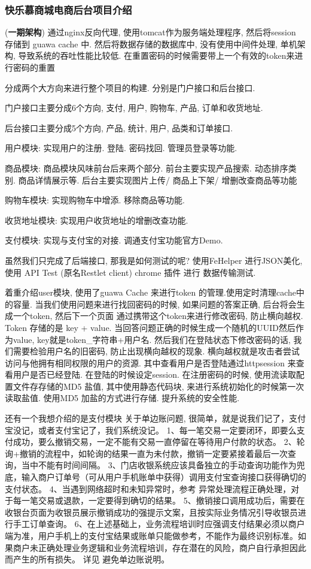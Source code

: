 \documentclass[UTF8]{ctexart}
\begin{document}
\subsubsection{快乐慕商城电商后台项目介绍}
(\textbf{一期架构}) 通过nginx反向代理, 使用tomcat作为服务端处理程序, 然后将session 存储到 guawa cache 中. 然后将数据存储的数据库中, 没有使用中间件处理, 单机架构, 导致系统的吞吐性能比较低. 在重置密码的时候需要带上一个有效的token来进行密码的重置

分成两个大方向来进行整个项目的构建. 分别是门户接口和后台接口.

门户接口主要分成6个方向, 支付, 用户, 购物车, 产品, 订单和收货地址.

后台接口主要分成5个方向, 产品, 统计, 用户, 品类和订单接口.

用户模块: 实现用户的注册. 登陆. 密码找回. 管理员登录等功能.

商品模块: 商品模块风味前台后来两个部分. 前台主要实现产品搜索. 动态排序类别. 商品详情展示等. 后台主要实现图片上传/ 商品上下架/ 增删改查商品等功能

购物车模块: 实现购物车中增添. 移除商品等功能.

收货地址模块: 实现用户收货地址的增删改查功能.

支付模块: 实现与支付宝的对接. 调通支付宝功能官方Demo.

虽然我们只完成了后端接口, 那我是如何测试的呢?  使用FeHelper 进行JSON美化, 使用 API Test (原名Restlet client) chrome 插件 进行 数据传输测试.

着重介绍user模块, 使用了guawa Cache 来进行token 的管理.使用定时清理cache中的容量.
当我们使用问题来进行找回密码的时候, 如果问题的答案正确, 后台将会生成一个token, 然后下一个页面 通过携带这个token来进行修改密码, 防止横向越权. Token 存储的是 key + value. 当回答问题正确的时候生成一个随机的UUID然后作为value, key就是token\_字符串+用户名. 然后我们在登陆状态下修改密码的话, 我们需要检验用户名的旧密码, 防止出现横向越权的现象. 横向越权就是攻击者尝试访问与他拥有相同权限的用户的资源. 其中查看用户是否登陆通过httpsession 来查看用户是否已经登陆.  在登陆的时候设定session. 在注册密码的时候, 使用流读取配置文件存存储的MD5 盐值, 其中使用静态代码块, 来进行系统初始化的时候第一次读取盐值. 使用MD5 加盐的方式进行存储.    提升系统的安全性能.





还有一个我想介绍的是支付模块
关于单边账问题, 很简单，就是说我们记了，支付宝没记，或者支付宝记了，我们系统没记。
1、每一笔交易一定要闭环，即要么支付成功，要么撤销交易，一定不能有交易一直停留在等待用户付款的状态。
2、轮询+撤销的流程中，如轮询的结果一直为未付款，撤销一定要紧接着最后一次查询，当中不能有时间间隔。
3、门店收银系统应该具备独立的手动查询功能作为兜底，输入商户订单号（可从用户手机账单中获得）调用支付宝查询接口获得确切的支付状态。
4、当遇到网络超时和未知异常时，参考 异常处理流程正确处理，对于每一笔交易或退款，一定要得到确切的结果。
5、撤销接口调用成功后，需要在收银台页面为收银员展示撤销成功的强提示文案，且按实际业务情况引导收银员进行手工订单查询。
6、在上述基础上，业务流程培训时应强调支付结果必须以商户端为准，用户手机上的支付宝结果或账单只能做参考，不能作为最终识别标准。如果商户未正确处理业务逻辑和业务流程培训，存在潜在的风险，商户自行承担因此而产生的所有损失。
详见 避免单边账说明。
\end{document}
